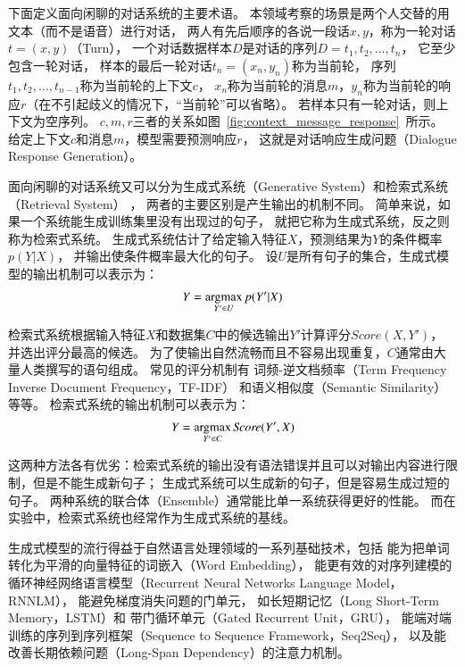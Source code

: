 下面定义面向闲聊的对话系统的主要术语。
本领域考察的场景是两个人交替的用文本（而不是语音）进行对话，
两人有先后顺序的各说一段话$x, y$，称为一轮对话$t = (x, y)$（Turn），
一个对话数据样本$D$是对话的序列$D = t_1, t_2, \dots, t_n$，
它至少包含一轮对话，
样本的最后一轮对话$t_n = (x_n, y_n)$称为当前轮，
序列$t_1, t_2, \dots, t_{n-1}$称为当前轮的上下文$c$，
$x_n$称为当前轮的消息$m$，$y_n$称为当前轮的响应$r$（在不引起歧义的情况下，“当前轮”可以省略）。
若样本只有一轮对话，则上下文为空序列。
$c,m,r$三者的关系如图~\ref{fig:context_message_response}~所示。
给定上下文$c$和消息$m$，模型需要预测响应$r$，
这就是对话响应生成问题（Dialogue Response Generation）。


面向闲聊的对话系统又可以分为生成式系统（Generative System）和检索式系统（Retrieval System）
，
两者的主要区别是产生输出的机制不同。
简单来说，如果一个系统能生成训练集里没有出现过的句子，
就把它称为生成式系统，反之则称为检索式系统。
生成式系统估计了给定输入特征$X$，预测结果为$Y$的条件概率$p(Y|X)$，
并输出使条件概率最大化的句子。
设$U$是所有句子的集合，生成式模型的输出机制可以表示为：
\begin{align}
    Y = \operatorname*{argmax}_{Y'\in U} p(Y'|X)
\end{align}

检索式系统根据输入特征$X$和数据集$C$中的候选输出$Y'$计算评分$\textit{Score}(X, Y')$，
并选出评分最高的候选。
为了使输出自然流畅而且不容易出现重复，$C$通常由大量人类撰写的语句组成。
常见的评分机制有
词频-逆文档频率（Term Frequency Inverse Document Frequency，TF-IDF）
和语义相似度（Semantic Similarity）等等。
检索式系统的输出机制可以表示为：
\begin{align}
    Y = \operatorname*{argmax}_{Y'\in C} \textit{Score}(Y', X)
\end{align}

这两种方法各有优劣：检索式系统的输出没有语法错误并且可以对输出内容进行限制，但是不能生成新句子；
生成式系统可以生成新的句子，但是容易生成过短的句子。
两种系统的联合体（Ensemble）通常能比单一系统获得更好的性能。
而在实验中，检索式系统也经常作为生成式系统的基线。

生成式模型的流行得益于自然语言处理领域的一系列基础技术，包括
能为把单词转化为平滑的向量特征的词嵌入（Word Embedding），
能更有效的对序列建模的循环神经网络语言模型（Recurrent Neural Networks Language Model，RNNLM），
能避免梯度消失问题的门单元，
如长短期记忆（Long Short-Term Memory，LSTM）和
带门循环单元（Gated Recurrent Unit，GRU），
能端对端训练的序列到序列框架（Sequence to Sequence Framework，Seq2Seq），
以及能改善长期依赖问题（Long-Span Dependency）的注意力机制。

